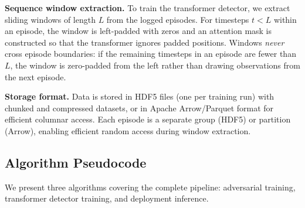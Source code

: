 \documentclass[conference]{IEEEtran}
\begin{document}
\textbf{Sequence window extraction.}  To train the transformer detector,
we extract sliding windows of length $L$ from the logged episodes.  For
timesteps $t < L$ within an episode, the window is left-padded with zeros
and an attention mask is constructed so that the transformer ignores
padded positions.  Windows \emph{never} cross episode boundaries: if the
remaining timesteps in an episode are fewer than $L$, the window is
zero-padded from the left rather than drawing observations from the next
episode.

\textbf{Storage format.}  Data is stored in HDF5 files (one per training
run) with chunked and compressed datasets, or in Apache Arrow/Parquet
format for efficient columnar access.  Each episode is a separate group
(HDF5) or partition (Arrow), enabling efficient random access during
window extraction.

\subsection{Algorithm Pseudocode}\label{sec:algorithms}

We present three algorithms covering the complete pipeline: adversarial
training, transformer detector training, and deployment inference.
\end{document}

